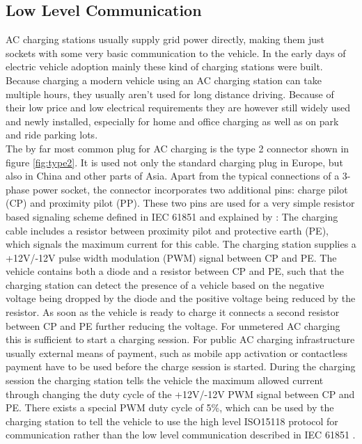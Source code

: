 \documentclass[conference,flushend]{iaria} %
\begin{document}
\subsection{Low Level Communication}
AC charging stations usually supply grid power directly, making them just sockets with some very basic communication to the vehicle.
In the early days of electric vehicle adoption mainly these kind of charging stations were built.
Because charging a modern vehicle using an AC charging station can take multiple hours, they usually aren't used for long distance driving.
Because of their low price and low electrical requirements they are however still widely used and newly installed, especially for home and office charging as well as on park and ride parking lots. \\
The by far most common plug for AC charging is the type 2 connector shown in figure \ref{fig:type2}. It is used not only the standard charging plug in Europe, but also in China and other parts of Asia.
Apart from the typical connections of a 3-phase power socket, the connector incorporates two additional pins: charge pilot (CP) and proximity pilot (PP).
These two pins are used for a very simple resistor based signaling scheme defined in IEC 61851 \cite{IEC61851} and explained by \cite{gonium_talk}:
The charging cable includes a resistor between proximity pilot and protective earth (PE), which signals the maximum current for this cable.
The charging station supplies a +12V/-12V pulse width modulation (PWM) signal between CP and PE.
The vehicle contains both a diode and a resistor between CP and PE, such that the charging station can detect the presence of a vehicle based on the negative voltage being dropped by the diode and the positive voltage being reduced by the resistor.
As soon as the vehicle is ready to charge it connects a second resistor between CP and PE further reducing the voltage.
For unmetered AC charging this is sufficient to start a charging session.
For public AC charging infrastructure usually external means of payment, such as mobile app activation or contactless payment have to be used before the charge session is started.
During the charging session the charging station tells the vehicle the maximum allowed current through changing the duty cycle of the +12V/-12V PWM signal between CP and PE.
There exists a special PWM duty cycle of 5\%, which can be used by the charging station to tell the vehicle to use the high level ISO15118 protocol for communication rather than the low level communication described in IEC 61851 \cite{IEC61851}.
\end{document}
